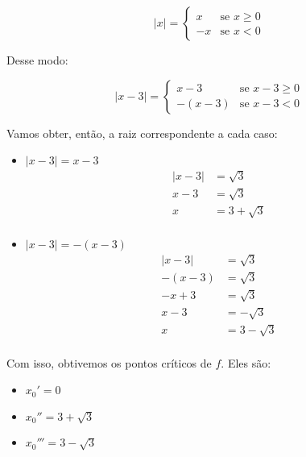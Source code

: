 \documentclass{article}
\begin{document}
\begin{equation} \label{modulus_definition}
    |x| =
    \left\{
    \begin{array}{ll}
        x  & \mbox{se } x \geq 0 \\
        -x & \mbox{se } x < 0
    \end{array}
    \right.
\end{equation}

Desse modo:

\begin{equation}
    |x - 3| =
    \left\{
    \begin{array}{ll}
        x - 3    & \mbox{se } x - 3 \geq 0 \\
        -(x - 3) & \mbox{se } x - 3 < 0
    \end{array}
    \right.
\end{equation}

Vamos obter, então, a raiz correspondente a cada caso:

\begin{itemize}
    \item \(|x - 3| = x - 3\)
          \begin{align*}
              |x-3| & = \sqrt{3}     \\
              x - 3 & = \sqrt{3}     \\
              x     & = 3 + \sqrt{3} \\
          \end{align*}
    \item \(|x - 3| = -(x - 3)\)
          \begin{align*}
              |x-3|    & = \sqrt{3}    \\
              -(x - 3) & = \sqrt{3}    \\
              -x + 3   & = \sqrt{3}    \\
              x - 3    & = -\sqrt{3}   \\
              x        & = 3 -\sqrt{3} \\
          \end{align*}
\end{itemize}

Com isso, obtivemos os pontos críticos de \(f\). Eles são:
\begin{itemize}
    \item \(x_0' = 0\)
    \item \(x_0'' = 3 + \sqrt{3}\)
    \item \(x_0''' = 3 - \sqrt{3}\)
\end{itemize}
\end{document}
